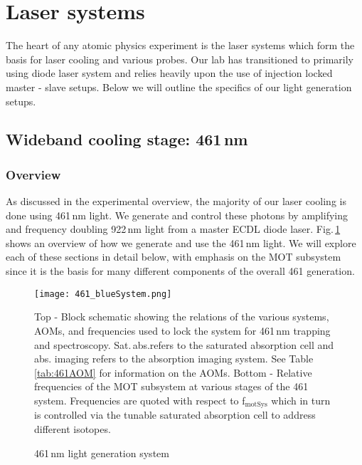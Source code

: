 \pagebreak
\section{Laser systems}\label{sec:laser_systems}
\setcounter{footnote}{0}
The heart of any atomic physics experiment is the laser systems which form the basis for laser cooling and various probes.
Our lab has transitioned to primarily using diode laser system and relies heavily upon the use of injection locked master - slave setups.
Below we will outline the specifics of our light generation setups.

\subsection{Wideband cooling stage: 461\,nm} \label{ssec:461sys}
\subsubsection{Overview}
As discussed in the experimental overview, the majority of our laser cooling is done using 461\,nm light. 
We generate and control these photons by amplifying and frequency doubling 922\,nm light from a master ECDL diode laser. 
Fig.\,\ref{fig:461blockSys} shows an overview of how we generate and use the 461\,nm light.
We will explore each of these sections in detail below, with emphasis on the MOT subsystem since it is the basis for many different components of the overall 461 generation.
	\begin{figure}
		\centerline{
		\texttt{[image: 461\_blueSystem.png]}}
		\caption{461\,nm light generation system}{Top - Block schematic showing the relations of the various systems, AOMs, and frequencies used to lock the system for 461\,nm trapping and spectroscopy. Sat.\,abs.\;refers to the saturated absorption cell and abs. imaging refers to the absorption imaging system. See Table \ref{tab:461AOM} for information on the AOMs. Bottom - Relative frequencies of the MOT subsystem at various stages of the 461 system. Frequencies are quoted with respect to f$_{\text{motSys}}$ which in turn is controlled via the tunable saturated absorption cell to address different isotopes.}
		\label{fig:461blockSys}
	\end{figure} 

